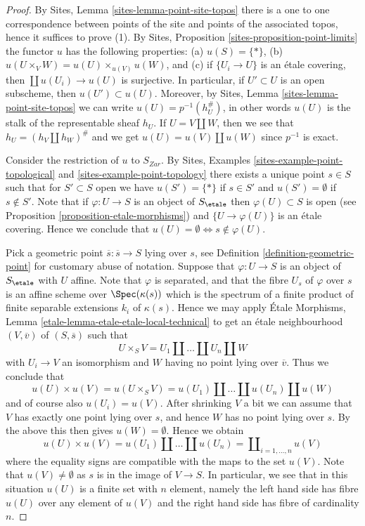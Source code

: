 \begin{proof}
By
Sites, Lemma \ref{sites-lemma-point-site-topos}
there is a one to one correspondence between points of the site and points
of the associated topos, hence it suffices to prove (1).
By
Sites, Proposition \ref{sites-proposition-point-limits}
the functor $u$ has the following properties:
(a) $u(S) = \{*\}$, (b) $u(U \times_V W) = u(U) \times_{u(V)} u(W)$, and
(c) if $\{U_i \to U\}$ is an \'etale covering, then
$\coprod u(U_i) \to u(U)$ is surjective.
In particular, if $U' \subset U$ is an open subscheme,
then $u(U') \subset u(U)$. Moreover, by
Sites, Lemma \ref{sites-lemma-point-site-topos}
we can write $u(U) = p^{-1}(h_U^\#)$, in other words $u(U)$ is the
stalk of the representable sheaf $h_U$. If
$U = V \amalg W$, then we see that $h_U = (h_V \amalg h_W)^\#$ and we get
$u(U) = u(V) \amalg u(W)$ since $p^{-1}$ is exact.

\medskip\noindent
Consider the restriction of $u$ to $S_{Zar}$. By
Sites, Examples \ref{sites-example-point-topological} and
\ref{sites-example-point-topology}
there exists a unique point $s \in S$ such that for $S' \subset S$ open we
have $u(S') = \{*\}$ if $s \in S'$ and $u(S') = \emptyset$ if $s \not \in S'$.
Note that if $\varphi : U \to S$ is an object of $S_\etale$ then
$\varphi(U) \subset S$ is open (see
Proposition \ref{proposition-etale-morphisms})
and $\{U \to \varphi(U)\}$ is an \'etale covering. Hence we conclude that
$u(U) = \emptyset \Leftrightarrow s \not \in \varphi(U)$.

\medskip\noindent
Pick a geometric point $\overline{s} : \overline{s} \to S$ lying over $s$, see
Definition \ref{definition-geometric-point}
for customary abuse of notation. Suppose that $\varphi : U \to S$ is an object
of $S_\etale$ with $U$ affine. Note that $\varphi$ is separated, and
that the fibre $U_s$ of $\varphi$ over $s$ is an affine scheme over
$\Spec(\kappa(s))$ which is the spectrum of a finite product of
finite separable extensions $k_i$ of $\kappa(s)$. Hence we may apply
\'Etale Morphisms, Lemma \ref{etale-lemma-etale-etale-local-technical}
to get an \'etale neighbourhood $(V, \overline{v})$ of $(S, \overline{s})$
such that
$$
U \times_S V = U_1 \amalg \ldots \amalg U_n \amalg W
$$
with $U_i \to V$ an isomorphism and $W$ having no point lying over
$\overline{v}$. Thus we conclude that
$$
u(U) \times u(V) =
u(U \times_S V) =
u(U_1) \amalg \ldots \amalg u(U_n) \amalg u(W)
$$
and of course also $u(U_i) = u(V)$. After shrinking $V$ a bit we can
assume that $V$ has exactly one point lying over $s$, and hence $W$ has no
point lying over $s$. By the above this then gives $u(W) = \emptyset$.
Hence we obtain
$$
u(U) \times u(V) =
u(U_1) \amalg \ldots \amalg u(U_n) =
\coprod\nolimits_{i = 1, \ldots, n} u(V)
$$
where the equality signs are compatible with the maps to the set $u(V)$.
Note that $u(V) \not = \emptyset$ as $s$ is in the image of $V \to S$.
In particular, we see that in this situation $u(U)$ is a finite
set with $n$ element, namely the left hand side has fibre $u(U)$ over
any element of $u(V)$ and the right hand side has fibre of cardinality $n$.


\end{proof}
